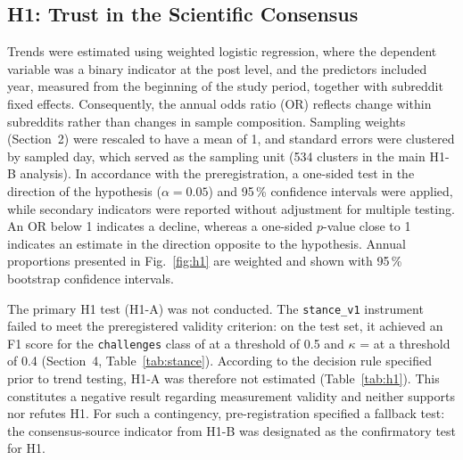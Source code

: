 \documentclass[10pt,a4paper]{article}
\newcommand{\kod}[1]{\texttt{#1}}
\begin{document}
\subsection{H1: Trust in the Scientific Consensus}

Trends were estimated using weighted logistic regression, where the dependent variable
was a binary indicator at the post level, and the predictors included year, measured from
the beginning of the study period, together with subreddit fixed effects. Consequently,
the annual odds ratio (OR) reflects change within subreddits rather than changes in sample
composition. Sampling weights (Section~2) were rescaled to have a mean of 1, and standard
errors were clustered by sampled day, which served as the sampling unit (534 clusters in
the main H1-B analysis). In accordance with the preregistration, a one-sided test in the
direction of the hypothesis ($\alpha = 0.05$) and 95\,\% confidence intervals were applied,
while secondary indicators were reported without adjustment for multiple testing.
An OR below 1 indicates a decline, whereas a one-sided $p$-value close to 1 indicates an
estimate in the direction opposite to the hypothesis. Annual proportions presented in
Fig.~\ref{fig:h1} are weighted and shown with 95\,\% bootstrap confidence intervals.

The primary H1 test (H1-A) was not conducted. The \kod{stance\_v1} instrument failed
to meet the preregistered validity criterion: on the test set, it achieved an F1 score
for the \kod{challenges} class of \resHoneATestChallengesF{} at a threshold of 0.5 and
$\kappa$ = \resHoneATestKappa{} at a threshold of 0.4 (Section~4, Table~\ref{tab:stance}).
According to the decision rule specified prior to trend testing, H1-A was therefore not
estimated (Table~\ref{tab:h1}). This constitutes a negative result regarding measurement
validity and neither supports nor refutes H1. For such a contingency, pre-registration 
specified a fallback test: the consensus-source indicator from H1-B was designated as the
confirmatory test for H1.
\end{document}
